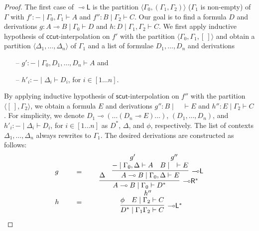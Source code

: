 \documentclass[sn-mathphys-num]{sn-jnl}%
\newcommand{\GG}{\Gamma}
\newcommand{\GD}{\Delta}
\newcommand{\vd}{\vdash}
\newcommand{\lolli}{\multimap}
\newcommand{\lleft}{{\lolli}\mathsf{L}}
\newcommand{\lright}{{\lolli}\mathsf{R}}
\newcommand{\mf}[1]{\mathsf{#1}}
\theoremstyle{thmstyleone}%
\theoremstyle{thmstyletwo}%
\theoremstyle{thmstylethree}%
\begin{document}
\begin{proof}
The first case of $\lleft$ is the partition $\langle \GG_0, (\GG_1, \GG_2) \rangle$ ($\GG_1$ is non-empty) of $\GG$ with $f' : {-} \mid \GG_0, \GG_1 \vd A$ and $f'': B \mid \GG_2 \vd C$.
Our goal is to find a formula $D$ and derivations $g : A\lolli B \mid \GG_0 \vd D$ and $h: D \mid \GG_1, \GG_2 \vd C$.
We first apply inductive hypothesis of $\mf{ccut}$-interpolation on $f'$ with the partition $\langle \GG_0 , \GG_1 , [\ ]\rangle$ and obtain a partition $\langle \GD_1, \dots , \GD_n \rangle$ of $\GG_1$ and a list of formulae $D_1 , \dots , D_n$ and derivations
\begin{itemize}
  \item[--] $g': {-} \mid \GG_0 , D_1, \dots, D_n \vd A$ and
  \item[--] $h'_i : {-} \mid \GD_i \vd D_i$, for $i \in [1\dots n]$.
\end{itemize}
By applying inductive hypothesis of $\mf{scut}$-interpolation on $f''$ with the partition $\langle [\ ] , \GG_2 \rangle$, we obtain a formula $E$ and derivations $g'' : B \mid \quad \vd E$ and $h'': E \mid \GG_2 \vd C$.
For simplicity, we denote $D_1 \lolli (\dots (D_n \lolli E)\dots)$, $(D_1 , \dots , D_n)$, and $h'_i : {-} \mid \GD_i \vd D_i$, for $i \in [1\dots n]$ as $D^*$, $\GD$, and $\phi$, respectively.
The list of contexts $\GD_1, \dots, \GD_n$ always rewrites to $\GG_1$.
The desired derivations are constructed as follows:
\begin{displaymath}
\begin{array}{lcc}
  \begin{array}{c}
    g
  \end{array}
  \quad 
  &=&
  \quad
    \begin{array}{c}
      \infer[\lright^*]{A\lolli B \mid \GG_0 \vd D^*}{
        \GD
        &
        \infer[\lleft]{A \lolli B \mid \GG_0 , \GD \vd E}{
          \deduce{{-} \mid \GG_0 , \GD \vd A}{g'}
          &
          \deduce{B \mid \quad \vd E}{g''}
        }
      }
    \end{array}
    \\[20pt]
    \begin{array}{c}
      h
    \end{array}
    \quad
    &=&
    \quad
    \begin{array}{c}
      \infer[\lleft^*]{D^* \mid \GG_1 \GG_2 \vd C}{
            \phi
            &
            \deduce{E \mid \GG_2 \vd C}{h''}
          }
    \end{array}
  \end{array}
\end{displaymath}

\end{proof}
\end{document}
